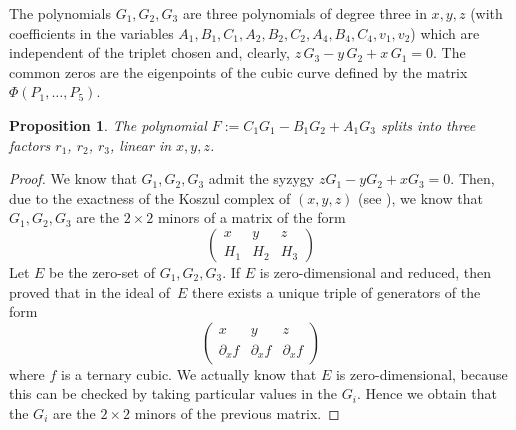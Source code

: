 \documentclass[11pt, a4paper, reqno, captions=tableheading,bibliography=totoc]{scrartcl}
\theoremstyle{plain}
\newtheorem{prop}[lemma]{Proposition}
\theoremstyle{definition}
\begin{document}
The polynomials $G_1, G_2, G_3$ are three polynomials of degree three
in $x, y, z$ (with coefficients in the variables
$A_1, B_1, C_1, A_2, B_2, C_2, A_4, B_4, C_4, v_1, v_2$) which are independent
of the triplet chosen and, clearly, $z\,G_3-y\,G_2+x\,G_1 = 0$. The common
zeros are the eigenpoints of the cubic curve defined by the matrix
$\Phi(P_1, \dots, P_5)$.

\begin{prop}
\label{proposition:G_split}
 The polynomial
$F := C_1G_1-B_1G_2+A_1G_3$ splits into three factors $r_1$, $r_2$, $r_3$,
linear in $x, y, z$.
\end{prop}
\begin{proof}
 We know that $G_1, G_2, G_3$ admit the syzygy $z G_1 - y G_2 + x G_3 = 0$.
Then, due to the exactness of the Koszul complex of $(x,y,z)$ (see \cite[Chapter~17]{Eisenbud1995}),
we know that $G_1, G_2, G_3$ are the $2 \times 2$ minors of a matrix of the form
%
\[
 \left(
 \begin{array}{ccc}
  x & y & z \\
  H_1 & H_2 & H_3
 \end{array}
 \right)
\]
%
Let $E$ be the zero-set of $G_1, G_2, G_3$.
If $E$ is zero-dimensional and reduced,
then \cite{BGV} proved that in the ideal of~$E$ there exists a unique triple of generators of the form
%
\[
 \left(
 \begin{array}{ccc}
  x & y & z \\
  \partial_x f & \partial_x f & \partial_x f
 \end{array}
 \right)
\]
%
where $f$ is a ternary cubic.
We actually know that $E$ is zero-dimensional, because this can be checked by taking particular values in the $G_i$.
Hence we obtain that the $G_i$ are the $2\times 2$ minors of the previous matrix.


\end{proof}
\end{document}
